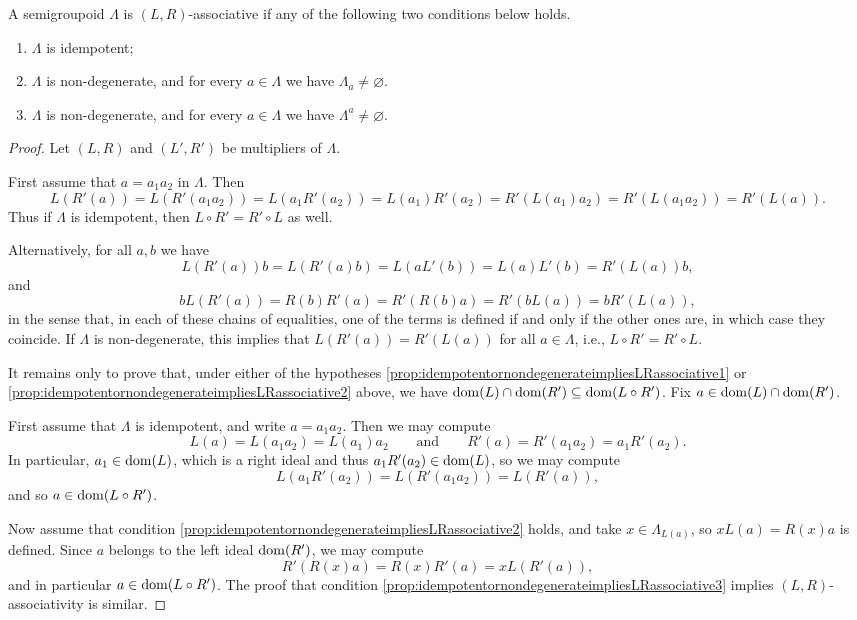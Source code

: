 \begin{proposition}\label{prop:idempotentornondegenerateimpliesLRassociative}
A semigroupoid $\Lambda$ is $(L,R)$-associative if any of the following two conditions below holds.
\begin{enumerate}[label=(\roman*)]
	\item\label{prop:idempotentornondegenerateimpliesLRassociative1} $\Lambda$ is idempotent;
	\item\label{prop:idempotentornondegenerateimpliesLRassociative2} $\Lambda$ is non-degenerate, and for every $a\in\Lambda$ we have $\Lambda_a\neq\varnothing$.
	\item\label{prop:idempotentornondegenerateimpliesLRassociative3} $\Lambda$ is non-degenerate, and for every $a\in\Lambda$ we have $\Lambda^a\neq\varnothing$.
\end{enumerate}
\end{proposition}
\begin{proof}
Let $(L,R)$ and $(L',R')$ be multipliers of $\Lambda$.

First assume that $a=a_1a_2$ in $\Lambda$. Then
\[L(R'(a))=L(R'(a_1a_2))=L(a_1R'(a_2))=L(a_1)R'(a_2)=R'(L(a_1)a_2)=R'(L(a_1a_2))=R'(L(a)).\]
Thus if $\Lambda$ is idempotent, then $L\circ R'=R'\circ L$ as well.

Alternatively, for all $a,b$ we have
\[L(R'(a))b=L(R'(a)b)=L(aL'(b))=L(a)L'(b)=R'(L(a))b,\]
and
\[bL(R'(a))=R(b)R'(a)=R'(R(b)a)=R'(bL(a))=bR'(L(a)),\]
in the sense that, in each of these chains of equalities, one of the terms is defined if and only if the other ones are, in which case they coincide. If $\Lambda$ is non-degenerate, this implies that $L(R'(a))=R'(L(a))$ for all $a\in\Lambda$, i.e., $L\circ R'=R'\circ L$.

It remains only to prove that, under either of the hypotheses \ref{prop:idempotentornondegenerateimpliesLRassociative1} or \ref{prop:idempotentornondegenerateimpliesLRassociative2} above, we have $\operatorname{dom}(L)\cap\operatorname{dom}(R')\subseteq\operatorname{dom}(L\circ R')$. Fix $a\in\operatorname{dom}(L)\cap\operatorname{dom}(R')$.

First assume that $\Lambda$ is idempotent, and write $a=a_1a_2$. Then we may compute
\[L(a)=L(a_1a_2)=L(a_1)a_2\qquad\text{and}\qquad R'(a)=R'(a_1a_2)=a_1R'(a_2).\]
In particular, $a_1\in\operatorname{dom}(L)$, which is a right ideal and thus $a_1R'(a_2)\in\operatorname{dom}(L)$, so we may compute
\[L(a_1R'(a_2))=L(R'(a_1a_2))=L(R'(a)),\]
and so $a\in\operatorname{dom}(L\circ R')$.

Now assume that condition \ref{prop:idempotentornondegenerateimpliesLRassociative2} holds, and take $x\in\Lambda_{L(a)}$, so $xL(a)=R(x)a$ is defined. Since $a$ belongs to the left ideal $\operatorname{dom}(R')$, we may compute
\[R'(R(x)a)=R(x)R'(a)=xL(R'(a)),\]
and in particular $a\in\operatorname{dom}(L\circ R')$. The proof that condition \ref{prop:idempotentornondegenerateimpliesLRassociative3} implies $(L,R)$-associativity is similar.\qedhere
\end{proof}

